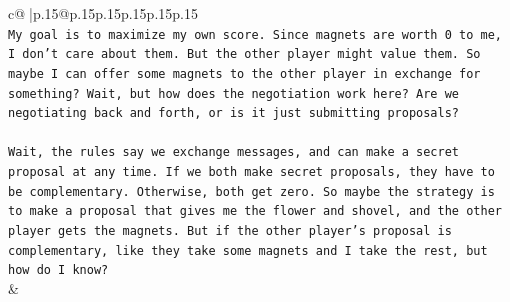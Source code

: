 \documentclass{article}
\begin{document}
{\begin{supertabular}{c@{$\;$}|p{.15\linewidth}@{}p{.15\linewidth}p{.15\linewidth}p{.15\linewidth}p{.15\linewidth}p{.15\linewidth}}
{{{\\ 
\texttt{My goal is to maximize my own score. Since magnets are worth 0 to me, I don't care about them. But the other player might value them. So maybe I can offer some magnets to the other player in exchange for something? Wait, but how does the negotiation work here? Are we negotiating back and forth, or is it just submitting proposals?} \\
\\ 
\texttt{Wait, the rules say we exchange messages, and can make a secret proposal at any time. If we both make secret proposals, they have to be complementary. Otherwise, both get zero. So maybe the strategy is to make a proposal that gives me the flower and shovel, and the other player gets the magnets. But if the other player's proposal is complementary, like they take some magnets and I take the rest, but how do I know?} \\
            }
        }
    }
    & \\ \\


\end{supertabular}}
\end{document}

